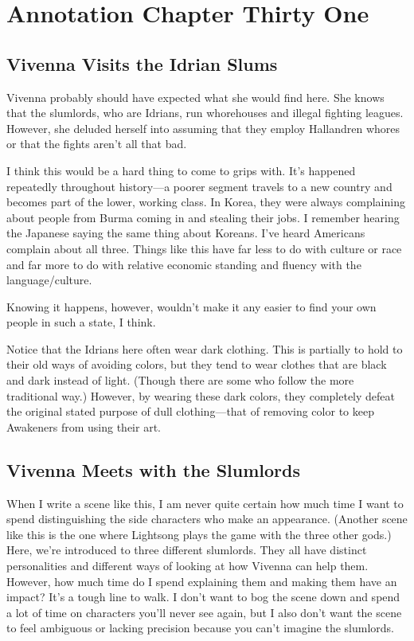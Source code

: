 \section{Annotation Chapter Thirty One}

\subsection*{Vivenna Visits the Idrian Slums}

Vivenna probably should have expected what she would find here. She knows that the slumlords, who are Idrians, run whorehouses and illegal fighting leagues. However, she deluded herself into assuming that they employ Hallandren whores or that the fights aren’t all that bad.

I think this would be a hard thing to come to grips with. It’s happened repeatedly throughout history—a poorer segment travels to a new country and becomes part of the lower, working class. In Korea, they were always complaining about people from Burma coming in and stealing their jobs. I remember hearing the Japanese saying the same thing about Koreans. I’ve heard Americans complain about all three. Things like this have far less to do with culture or race and far more to do with relative economic standing and fluency with the language/culture.

Knowing it happens, however, wouldn’t make it any easier to find your own people in such a state, I think.

Notice that the Idrians here often wear dark clothing. This is partially to hold to their old ways of avoiding colors, but they tend to wear clothes that are black and dark instead of light. (Though there are some who follow the more traditional way.) However, by wearing these dark colors, they completely defeat the original stated purpose of dull clothing—that of removing color to keep Awakeners from using their art.

\subsection*{Vivenna Meets with the Slumlords}

When I write a scene like this, I am never quite certain how much time I want to spend distinguishing the side characters who make an appearance. (Another scene like this is the one where Lightsong plays the game with the three other gods.) Here, we’re introduced to three different slumlords. They all have distinct personalities and different ways of looking at how Vivenna can help them. However, how much time do I spend explaining them and making them have an impact? It’s a tough line to walk. I don’t want to bog the scene down and spend a lot of time on characters you’ll never see again, but I also don’t want the scene to feel ambiguous or lacking precision because you can’t imagine the slumlords.

